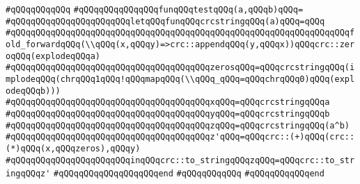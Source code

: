 \verb|#qQQqqQQqqQQq|\newline
\verb|#qQQqqQQqqQQqqQQqfunqQQqtestqQQq(a,qQQqb)qQQq=|\newline
\verb|#qQQqqQQqqQQqqQQqqQQqqQQqletqQQqfunqQQqcrcstringqQQq(a)qQQq=qQQq|\newline
\verb|#qQQqqQQqqQQqqQQqqQQqqQQqqQQqqQQqqQQqqQQqqQQqqQQqqQQqqQQqqQQqqQQqqQQqfold_forwardqQQq(\\qQQq(x,qQQqy)=>crc::appendqQQq(y,qQQqx))qQQqcrc::zeroqQQq(explodeqQQqa)|\newline
\verb|#qQQqqQQqqQQqqQQqqQQqqQQqqQQqqQQqqQQqqQQqzerosqQQq=qQQqcrcstringqQQq(implodeqQQq(chrqQQq1qQQq!qQQqmapqQQq(\\qQQq_qQQq=qQQqchrqQQq0)qQQq(explodeqQQqb)))|\newline
\verb|#qQQqqQQqqQQqqQQqqQQqqQQqqQQqqQQqqQQqqQQqxqQQq=qQQqcrcstringqQQqa|\newline
\verb|#qQQqqQQqqQQqqQQqqQQqqQQqqQQqqQQqqQQqqQQqyqQQq=qQQqcrcstringqQQqb|\newline
\verb|#qQQqqQQqqQQqqQQqqQQqqQQqqQQqqQQqqQQqqQQqzqQQq=qQQqcrcstringqQQq(a^b)|\newline
\verb|#qQQqqQQqqQQqqQQqqQQqqQQqqQQqqQQqqQQqqQQqz'qQQq=qQQqcrc::(+)qQQq(crc::(*)qQQq(x,qQQqzeros),qQQqy)|\newline
\verb|#qQQqqQQqqQQqqQQqqQQqqQQqinqQQqcrc::to_stringqQQqzqQQq=qQQqcrc::to_stringqQQqz'|\newline
\verb|#qQQqqQQqqQQqqQQqqQQqend|\newline
\verb|#qQQqqQQqqQQq|\newline
\verb|#qQQqqQQqqQQqend|\newline
\newline
\newline
\newline

